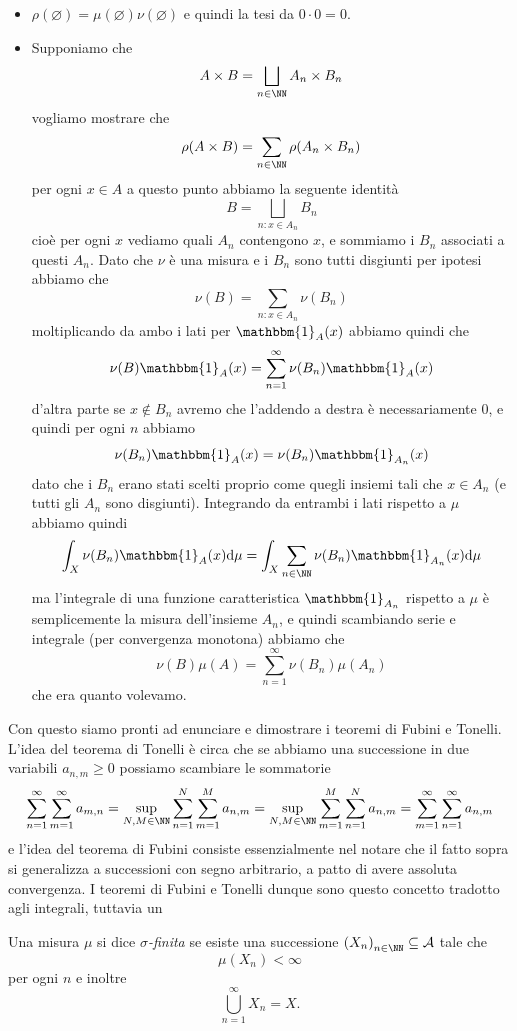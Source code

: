 \documentclass[11pt]{scrartcl}
\newcommand{\dif}{\text{d}}
\newcommand{\eset}{\varnothing}
\begin{document}
	\begin{itemize}
		\item $\rho(\eset)=\mu(\eset)\nu(\eset)$ e quindi la tesi da $0\cdot 0=0$.
		\item Supponiamo che 
		$$A\times B=\bigsqcup_{n\in\NN}A_n\times B_n$$
		vogliamo mostrare che 
		$$\rho(A\times B)=\sum_{n\in\NN} \rho(A_n\times B_n)$$
		per ogni $x\in A$ a questo punto abbiamo la seguente identità
		$$B=\bigsqcup_{n:x\in A_n}B_n$$
		cioè per ogni $x$ vediamo quali $A_n$ contengono $x$, e sommiamo i $B_n$ associati a questi $A_n$. Dato che $\nu$ è una misura e i $B_n$ sono tutti disgiunti per ipotesi abbiamo che
		$$\nu(B)=\sum_{n:x\in A_n} \nu(B_n)$$
		moltiplicando da ambo i lati per $\mathbbm{1}_A(x)$ abbiamo quindi che
		$$\nu(B)\mathbbm{1}_A(x)=\sum_{n=1}^{\infty}\nu(B_n)\mathbbm{1}_A(x)$$
		d'altra parte se $x\not\in B_n$ avremo che l'addendo a destra è necessariamente $0$, e quindi per ogni $n$ abbiamo
		$$\nu(B_n)\mathbbm{1}_{A}(x)=\nu(B_n)\mathbbm{1}_{A_n}(x)$$
		dato che i $B_n$ erano stati scelti proprio come quegli insiemi tali che $x\in A_n$ (e tutti gli $A_n$ sono disgiunti). Integrando da entrambi i lati rispetto a $\mu$ abbiamo quindi
		$$\int_X \nu(B_n)\mathbbm{1}_A(x)\dif \mu=\int_X \sum_{n\in\NN}\nu(B_n)\mathbbm{1}_{A_n}(x)\dif \mu$$
		ma l'integrale di una funzione caratteristica $\mathbbm{1}_{A_n}$ rispetto a $\mu$ è semplicemente la misura dell'insieme $A_n$, e quindi scambiando serie e integrale (per convergenza monotona) abbiamo che
		$$\nu(B)\mu(A)=\sum_{n=1}^{\infty}\nu(B_n)\mu(A_n)$$
		che era quanto volevamo.
	\end{itemize}
	Con questo siamo pronti ad enunciare e dimostrare i teoremi di Fubini e Tonelli. L'idea del teorema di Tonelli è circa che se abbiamo una successione in due variabili $a_{n,m}\ge 0$ possiamo scambiare le sommatorie
	$$\sum_{n=1}^\infty\sum_{m=1}^\infty a_{m,n}=\sup_{N,M\in\NN}\sum_{n=1}^{N}\sum_{m=1}^{M}a_{n,m}=\sup_{N,M\in\NN}\sum_{m=1}^{M}\sum_{n=1}^{N}a_{n,m}=\sum_{m=1}^{\infty}\sum_{n=1}^{\infty}a_{n,m}$$
	e l'idea del teorema di Fubini consiste essenzialmente nel notare che il fatto sopra si generalizza a successioni con segno arbitrario, a patto di avere assoluta convergenza. I teoremi di Fubini e Tonelli dunque sono questo concetto tradotto agli integrali, tuttavia un 
	\begin{definition}
		Una misura $\mu$ si dice \textit{$\sigma$-finita} se esiste una successione $\left(X_n\right)_{n\in\NN}\subseteq \mathcal{A}$ tale che 
		$$\mu(X_n)<\infty$$
		per ogni $n$ e inoltre
		$$\bigcup_{n=1}^\infty X_n=X.$$ 
	\end{definition}
\end{document}
